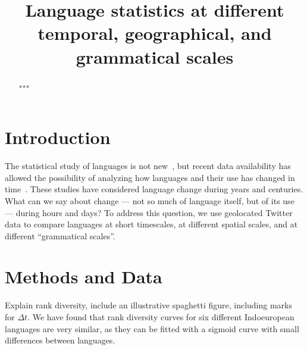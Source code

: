 \documentclass[12pt]{article}
\begin{document}
\title{Language statistics at different temporal, geographical, and grammatical scales}
\maketitle

\begin{abstract}
***
\end{abstract}

\section{Introduction}

The statistical study of languages is not new~\cite{zipf}, but recent data availability has allowed the possibility of analyzing how languages and their use has changed in time~\cite{Michel14012011,Perc07122012,PhysRevX.3.021006,Cocho2015}. 
These studies have considered language change during years and centuries. What can we say about change --- not so much of language itself, but of its use --- during hours and days? To address this question, we use geolocated Twitter data to compare languages at short timescales, at different spatial scales, and at different ``grammatical scales''.


\section{Methods and Data}

Explain rank diversity, include an illustrative spaghetti figure, including marks for $\Delta t$.
\cite{Cocho2015,Morales2016,10.3389/fphy.2018.00045,Cocho2019}
We have found that rank diversity curves for six different Indoeuropean languages are very similar, as they can be fitted with a sigmoid curve with small differences between languages. 
\end{document}

